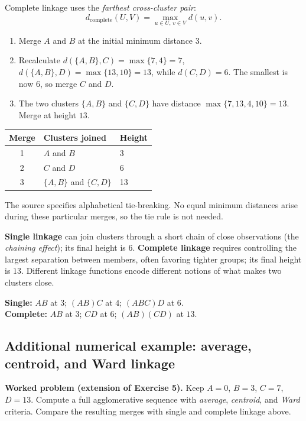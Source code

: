 Complete linkage uses the \emph{farthest cross-cluster pair}:
\[
d_{\mathrm{complete}}(U,V)=\max_{u\in U,\,v\in V} d(u,v).
\]
\begin{enumerate}[label=\textbf{Step \arabic*.}]
\item Merge $A$ and $B$ at the initial minimum distance $3$.
\item Recalculate $d(\{A,B\},C)=\max\{7,4\}=7$, $d(\{A,B\},D)=\max\{13,10\}=13$, while $d(C,D)=6$. The smallest is now $6$, so merge $C$ and $D$.
\item The two clusters $\{A,B\}$ and $\{C,D\}$ have distance $\max\{7,13,4,10\}=13$. Merge at height $13$.
\end{enumerate}
\begin{center}\begin{tabular}{@{}cll@{}}\toprule Merge&Clusters joined&Height\\\midrule 1&$A$ and $B$&3\\2&$C$ and $D$&6\\3&$\{A,B\}$ and $\{C,D\}$&13\\\bottomrule\end{tabular}\end{center}
The source specifies alphabetical tie-breaking. No equal minimum distances arise during these particular merges, so the tie rule is not needed.

\textbf{Single linkage} can join clusters through a short chain of close observations (the \emph{chaining effect}); its final height is $6$. \textbf{Complete linkage} requires controlling the largest separation between members, often favoring tighter groups; its final height is $13$. Different linkage functions encode different notions of what makes two clusters close.
\begin{answer}
\textbf{Single:} $AB$ at $3$; $(AB)C$ at $4$; $(ABC)D$ at $6$.\\
\textbf{Complete:} $AB$ at $3$; $CD$ at $6$; $(AB)(CD)$ at $13$.
\end{answer}

\subsection*{Additional numerical example: average, centroid, and Ward linkage}
\textbf{Worked problem (extension of Exercise 5).} Keep $A=0$, $B=3$, $C=7$, $D=13$. Compute a full agglomerative sequence with \emph{average}, \emph{centroid}, and \emph{Ward} criteria. Compare the resulting merges with single and complete linkage above.


